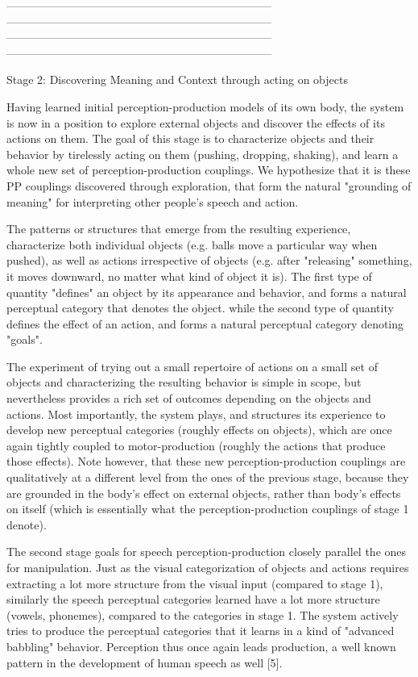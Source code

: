 -----------------------------------------------------------------------
-----------------------------------------------------------------------
-----------------------------------------------------------------------
-----------------------------------------------------------------------


Stage 2: Discovering Meaning and Context through acting on objects

Having learned initial perception-production models of its own body,
the system is now in a position to explore external objects and
discover the effects of its actions on them. The goal of this stage is
to characterize objects and their behavior by tirelessly acting on
them (pushing, dropping, shaking), and learn a whole new set of
perception-production couplings. We hypothesize that it is these PP
couplings discovered through exploration, that form the natural
"grounding of meaning" for interpreting other people's speech and
action.

The patterns or structures that emerge from the resulting experience,
characterize both individual objects (e.g. balls move a particular way
when pushed), as well as actions irrespective of objects (e.g. after
"releasing" something, it moves downward, no matter what kind of
object it is). The first type of quantity "defines" an object by its
appearance and behavior, and forms a natural perceptual category that
denotes the object. while the second type of quantity defines the
effect of an action, and forms a natural perceptual category denoting
"goals".

The experiment of trying out a small repertoire of actions on a small
set of objects and characterizing the resulting behavior is simple in
scope, but nevertheless provides a rich set of outcomes depending on
the objects and actions. Most importantly, the system plays, and
structures its experience to develop new perceptual categories
(roughly effects on objects), which are once again tightly coupled to
motor-production (roughly the actions that produce those
effects). Note however, that these new perception-production couplings
are qualitatively at a different level from the ones of the previous
stage, because they are grounded in the body's effect on external
objects, rather than body's effects on itself (which is essentially
what the perception-production couplings of stage 1 denote).

The second stage goals for speech perception-production closely
parallel the ones for manipulation. Just as the visual categorization
of objects and actions requires extracting a lot more structure from
the visual input (compared to stage 1), similarly the speech
perceptual categories learned have a lot more structure (vowels,
phonemes), compared to the categories in stage 1. The system actively
tries to produce the perceptual categories that it learns in a kind of
"advanced babbling" behavior. Perception thus once again leads
production, a well known pattern in the development of human speech as
well [5].

